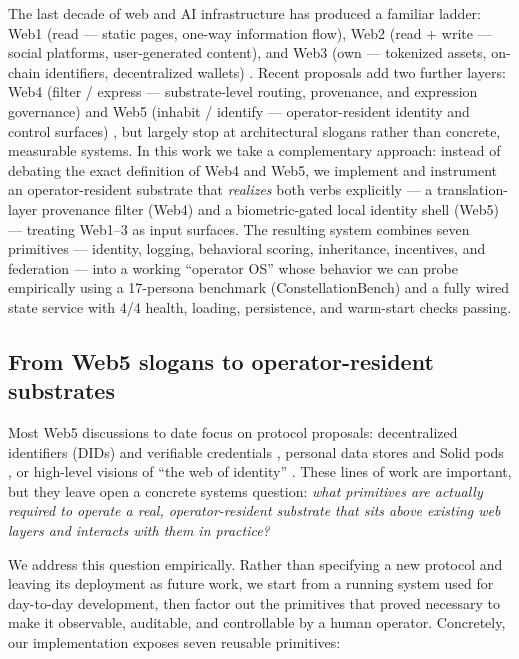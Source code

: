 The last decade of web and AI infrastructure has produced a familiar
ladder: Web1 (read --- static pages, one-way information flow), Web2
(read + write --- social platforms, user-generated content), and Web3
(own --- tokenized assets, on-chain identifiers, decentralized wallets)
\citep{bernerslee1989, oconnor2023web4}. Recent proposals add two
further layers: Web4 (filter / express --- substrate-level routing,
provenance, and expression governance) and Web5 (inhabit / identify ---
operator-resident identity and control surfaces)
\citep{tbd_web5, solid_pods, ssi_survey}, but largely stop at
architectural slogans rather than concrete, measurable systems. In this
work we take a complementary approach: instead of debating the exact
definition of Web4 and Web5, we implement and instrument an
operator-resident substrate that \emph{realizes} both verbs explicitly
--- a translation-layer provenance filter (Web4) and a biometric-gated
local identity shell (Web5) --- treating Web1--3 as input surfaces. The
resulting system combines seven primitives --- identity, logging,
behavioral scoring, inheritance, incentives, and federation --- into a
working ``operator OS'' whose behavior we can probe empirically using a
17-persona benchmark (ConstellationBench) and a fully wired state
service with 4/4 health, loading, persistence, and warm-start checks
passing.

\subsection{From Web5 slogans to operator-resident
substrates}\label{from-web5-slogans-to-operator-resident-substrates}

Most Web5 discussions to date focus on protocol proposals: decentralized
identifiers (DIDs) and verifiable credentials \citep{w3c_did_core},
personal data stores and Solid pods \citep{solid_pods}, or high-level
visions of ``the web of identity'' \citep{tbd_web5}. These lines of work
are important, but they leave open a concrete systems question:
\emph{what primitives are actually required to operate a real,
operator-resident substrate that sits above existing web layers and
interacts with them in practice?}

We address this question empirically. Rather than specifying a new
protocol and leaving its deployment as future work, we start from a
running system used for day-to-day development, then factor out the
primitives that proved necessary to make it observable, auditable, and
controllable by a human operator. Concretely, our implementation exposes
seven reusable primitives:

